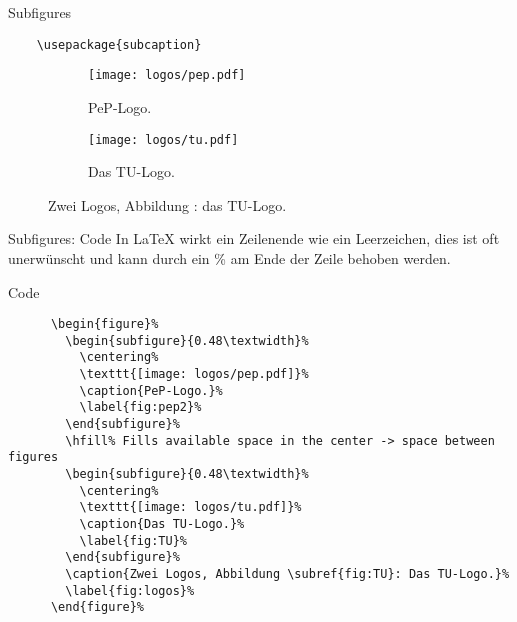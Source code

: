 \begin{frame}[fragile]{
  Subfigures
  \hfill
}
  \begin{Packages}
    \begin{lstlisting}
    \usepackage{subcaption}
    \end{lstlisting}
  \end{Packages}
  \begin{EmulateArticle}%
    \begin{figure}%
      \begin{subfigure}{0.48\textwidth}%
        \centering%
        \texttt{[image: logos/pep.pdf]}%
        \caption{PeP-Logo.}%
        \label{fig:pep2}%
      \end{subfigure}%
      \hfill%
      \begin{subfigure}{0.48\textwidth}%
        \centering%
        \texttt{[image: logos/tu.pdf]}%
        \caption{Das TU-Logo.}%
        \label{fig:TU}%
      \end{subfigure}%
      \caption{Zwei Logos, Abbildung : das TU-Logo.}\label{fig:logos}%
    \end{figure}%
  \end{EmulateArticle}
\end{frame}

\begin{frame}[fragile]{Subfigures: Code}
  In \LaTeX{} wirkt ein Zeilenende wie ein Leerzeichen,
  dies ist oft unerwünscht und kann durch ein \% am Ende der Zeile behoben werden.

  \begin{block}{Code}
    \begin{lstlisting}
      \begin{figure}%
        \begin{subfigure}{0.48\textwidth}%
          \centering%
          \texttt{[image: logos/pep.pdf]}%
          \caption{PeP-Logo.}%
          \label{fig:pep2}%
        \end{subfigure}%
        \hfill% Fills available space in the center -> space between figures
        \begin{subfigure}{0.48\textwidth}%
          \centering%
          \texttt{[image: logos/tu.pdf]}%
          \caption{Das TU-Logo.}%
          \label{fig:TU}%
        \end{subfigure}%
        \caption{Zwei Logos, Abbildung \subref{fig:TU}: Das TU-Logo.}%
        \label{fig:logos}%
      \end{figure}%
    \end{lstlisting}
  \end{block}
\end{frame}

